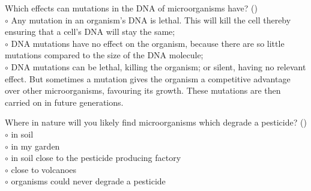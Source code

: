 \documentclass[]{beamer}
\begin{document}
\begin{frame}[shrink] {}
\addtocounter{questions}{1}
\color{blue}
Which effects can mutations in the DNA of microorganisms have? ()\\
\color{black}
\setlength{\parindent}{-0.4cm}
{\color{red}$\circ$} Any mutation in an organism's DNA is lethal. This will kill the cell
thereby ensuring that a cell’s DNA will stay the same;\\
{\color{red}$\circ$} DNA mutations have no effect on the organism, because there are
so little mutations compared to the size of the DNA molecule;\\
{\color{red}$\circ$} DNA mutations can be lethal, killing the organism; or silent, having
no relevant effect. But sometimes a mutation gives the organism a
competitive advantage over other microorganisms, favouring its
growth. These mutations are then carried on in future generations.
\end{frame}

\begin{frame}[shrink] {}
\addtocounter{questions}{1}
\color{blue}
Where in nature will you likely find microorganisms which degrade a
pesticide? ()\\
\color{black}
\setlength{\parindent}{-0.4cm}
{\color{red}$\circ$} in soil\\
{\color{red}$\circ$} in my garden\\
{\color{red}$\circ$} in soil close to the pesticide producing factory\\
{\color{red}$\circ$} close to volcanoes\\
{\color{red}$\circ$} organisms could never degrade a pesticide 
\end{frame}
\end{document}
